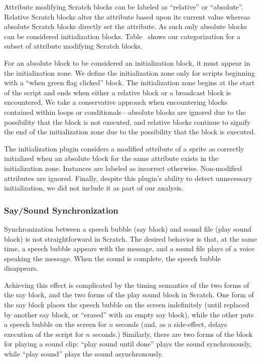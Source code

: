 Attribute modifying Scratch blocks can be labeled as ``relative'' or
``absolute''. Relative Scratch blocks alter the attribute based upon its
current value whereas absolute Scratch blocks directly set the attribute. As
such only absolute blocks can be considered initialization
blocks. Table~ shows our categorization for a
subset of attribute modifying Scratch blocks.

For an absolute block to be considered an initialization block, it must appear
in the initialization zone. We define the initialization zone only for scripts
beginning with a ``when green flag clicked'' block. The initialization zone
begins at the start of the script and ends when either a relative block or a
broadcast block is encountered. We take a conservative approach when
encountering blocks contained within loops or conditionals---absolute blocks
are ignored due to the possibility that the block is not executed, and relative
blocks continue to signify the end of the initialization zone due to the
possibility that the block is executed.

The initialization plugin considers a modified attribute of a sprite as
correctly initialized when an absolute block for the same attribute exists in
the initialization zone. Instances are labeled as incorrect
otherwise. Non-modified attributes are ignored. Finally, despite this plugin's
ability to detect unnecessary initialization, we did not include it as part of
our analysis.


\subsubsection*{Say/Sound Synchronization}
Synchronization between a speech bubble (say block) and sound file (play sound
block) is not straightforward in Scratch.  The desired behavior is that, at the
same time, a speech bubble appears with the message, and a sound file plays of
a voice speaking the message.  When the sound is complete, the speech bubble
disappears.

Achieving this effect is complicated by the timing semantics of the two forms
of the say block, and the two forms of the play sound block in Scratch.  One
form of the say block places the speech bubble on the screen indefinitely
(until replaced by another say block, or ``erased'' with an empty say block),
while the other puts a speech bubble on the screen for $n$ seconds (and, as a
side-effect, delays execution of the script for $n$ seconds.)  Similarly, there
are two forms of the block for playing a sound clip: ``play sound until done''
plays the sound synchronously, while ``play sound'' plays the sound
asynchronously.

